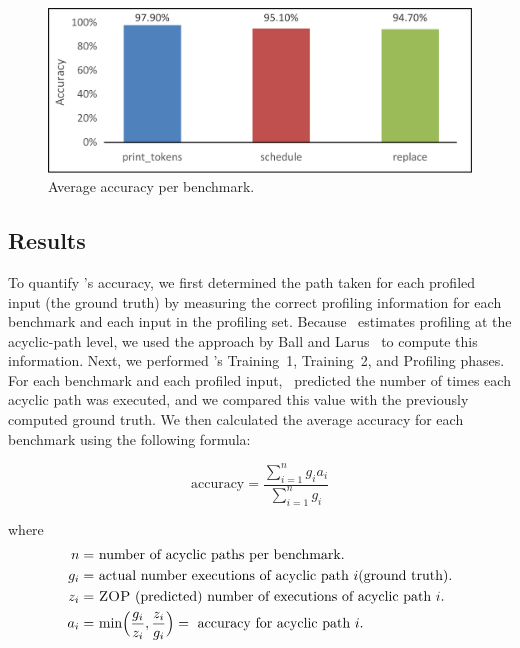 \begin{figure}[htb]
\includegraphics[width=5in]{../issta_profile/profiling/figures/overall-correctness}
\caption{Average accuracy per benchmark.}
\label{fig:overall_correctness}
\end{figure}

\subsection{Results}

To quantify \zop's accuracy, we first determined the path taken for each profiled input (\ie the ground truth) by measuring the correct profiling information for each benchmark and each input in the profiling set. Because \zop\ estimates profiling at the acyclic-path level, we used the approach by Ball and Larus~\cite{Ball:1996:EPP:243846.243857} to compute this information. Next, we performed \zop's Training~1, Training~2, and Profiling phases. For each benchmark and each profiled input, \zop\ predicted the number of times each acyclic path was executed, and we compared this value with the previously computed ground truth. We then calculated the average accuracy for each benchmark using the following formula:

\[\textrm{accuracy} = \frac{\sum_{i=1}^{n}g_{i} a_{i}}{\sum_{i=1}^{n}g_{i}}\]

where 
\begin{align*}
  n = & \textrm{~number of acyclic paths per benchmark.} \\
  g_i = & \textrm{~actual number executions of acyclic path~} i
          \textrm{(ground truth)}. \\
  z_i = & \textrm{~\zop~(predicted) number of executions of acyclic path~} i. \\
  a_{i} = & \textrm{~min} \Big (\frac{g_i}{z_i}, \frac{z_i}{g_i} \Big)
            = \textrm{~accuracy for acyclic path~} i. \\
\end{align*}

